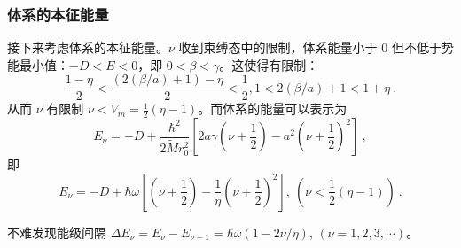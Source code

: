 \subsubsection{体系的本征能量}
接下来考虑体系的本征能量。$\nu$ 收到束缚态中的限制，体系能量小于 $0$ 但不低于势能最小值：$-D < E < 0$，即 $0 < \beta < \gamma$。这使得有限制：
\begin{equation}
\frac{1-\eta}2 < \frac{(2 (\beta/a) + 1) - \eta}2 < \frac12, 1 < 2 (\beta/a) + 1 <  1 + \eta ~.
\end{equation}
从而 $\nu$ 有限制 $\nu < V_m = \frac{1}{2} (\eta-1)$。而体系的能量可以表示为
\begin{equation}
E_\nu = -D + \frac{\hbar^2}{2 \widetilde M r_0^2} \left[2a\gamma\left(\nu+\frac12\right) - a^2 \left(\nu + \frac12\right)^2\right] ~,
\end{equation}
即
\begin{equation}
E_\nu = -D + \hbar \omega \left[\left(\nu+\frac12\right) - \frac1\eta \left(\nu + \frac12\right)^2\right], \ \left(\nu < \frac12 (\eta - 1)\right) ~.
\end{equation}

不难发现能级间隔 $\Delta E_\nu = E_\nu - E_{\nu - 1} = \hbar \omega (1 - 2 \nu / \eta)$,  $(\nu = 1, 2, 3, \cdots)$。

